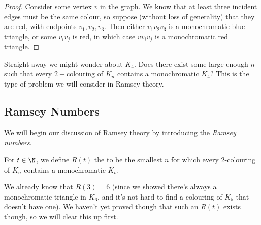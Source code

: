 \documentclass[a4paper]{scrartcl}
\begin{document}
\begin{proof}
	Consider some vertex $v$ in the graph. We know that at least three incident edges must be the same colour, so suppose (without loss of generality) that they are red, with endpoints $v_1, v_2, v_3$. Then either $v_1 v_2 v_3$ is a monochromatic blue triangle, or some $v_i v_j$ is red, in which case $v v_i v_j$ is a monochromatic red triangle.
\end{proof}

Straight away we might wonder about $K_4$. Does there exist some large enough $n$ such that every $2-$colouring of $K_n$ contains a monochromatic $K_4$? This is the type of problem we will consider in Ramsey theory.


\subsection{Ramsey Numbers}\label{sec:ramseynums}

We will begin our discussion of Ramsey theory by introducing the \emph{Ramsey numbers}.

\begin{definition}
	For $t \in \N$, we define $R(t)$ the  to be the smallest $n$ for which every $2$-colouring of $K_n$ contains a monochromatic $K_t$.
\end{definition}

We already know that $R(3) = 6$ (since we showed there's always a monochromatic triangle in $K_6$, and it's not hard to find a colouring of $K_5$ that doesn't have one). We haven't yet proved though that such an $R(t)$ exists though, so we will clear this up first.
\end{document}
